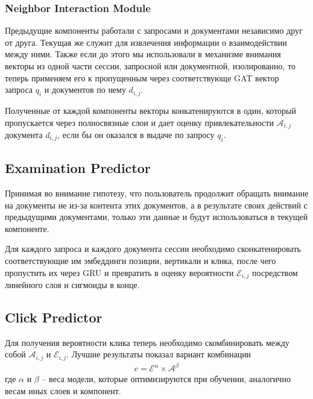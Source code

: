 \documentclass[diploma]{nanolab2015}
\begin{document}
\subsubsection{Neighbor Interaction Module}
Предыдущие компоненты работали с запросами и документами независимо друг от друга. Текущая же служит для извлечения информации о взаимодействии между ними. Также если до этого мы использовали в механизме внимания векторы из одной части сессии, запросной или документной, изолированно, то теперь применяем его к пропущенным через соответствующе GAT вектор запроса $q_i$ и документов по нему $d_{i,j}$.

Полученные от каждой компоненты векторы конкатенируются в один, который пропускается через полносвязные слои и дает оценку привлекательности $\mathcal{A}_{i,j}$ документа $d_{i,j}$, если бы он оказался в выдаче по запросу ${q_i}$.

\subsection{Examination Predictor}
Принимая во внимание гипотезу, что пользователь продолжит обращать внимание на документы не из-за контента этих документов, а в результате своих действий с предыдущими документами, только эти данные и будут использоваться в текущей компоненте.

Для каждого запроса и каждого документа сессии необходимо сконкатенировать соответствующие им эмбеддинги позиции, вертикали и клика, после чего пропустить их через GRU и превратить в оценку вероятности $\mathcal{E}_{i,j}$ посредством линейного слоя и сигмоиды в конце.

\subsection{Click Predictor}
Для получения вероятности клика теперь необходимо скомбинировать между собой $\mathcal{A}_{i,j}$ и $\mathcal{E}_{i,j}$. Лучшие результаты показал вариант комбинации
\begin{align}
  c = \mathcal{E}^\alpha \times \mathcal{A}^\beta
\end{align}
где $\alpha$ и $\beta$ -- веса модели, которые оптимизируются при обучении, аналогично весам иных слоев и компонент.
\end{document}
